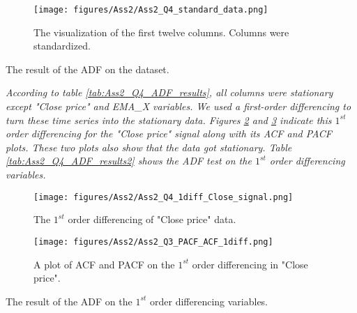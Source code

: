 \begin{figure}[H]
    \centering
    \begin{minipage}[b]{1\textwidth}
        \texttt{[image: figures/Ass2/Ass2\_Q4\_standard\_data.png]}
    \end{minipage}
    \caption{The visualization of the first twelve columns. Columns were standardized.}
    \label{fig:Ass2_Q4_standard_data}
\end{figure}


\begin{table}[H]
\centering
\caption{The result of the \gls{ADF} on the dataset.}
\label{tab:Ass2_Q4_ADF_results}

\end{table}

\textit{According to table \ref{tab:Ass2_Q4_ADF_results}, all columns were stationary except "Close price" and EMA\_X variables.  
We used a first-order differencing to turn these time series into the stationary data. Figures \ref{fig:Ass2_Q4_1diff_Close_signal} and \ref{fig:Ass2_Q4_PACF_ACF_1diff} indicate this $1^{st}$ order differencing for the "Close price" signal along with its \gls{ACF} and \gls{PACF} plots. These two plots also show that the data got stationary. Table \ref{tab:Ass2_Q4_ADF_results2} shows the ADF test on the $1^{st}$ order differencing variables.}

\begin{figure}[H]
    \centering
    \begin{minipage}[b]{1\textwidth}
        \texttt{[image: figures/Ass2/Ass2\_Q4\_1diff\_Close\_signal.png]}
    \end{minipage}
    \caption{The $1^{st}$ order differencing of "Close price" data.}
    \label{fig:Ass2_Q4_1diff_Close_signal}
\end{figure}

\begin{figure}[H]
    \centering
    \begin{minipage}[b]{1\textwidth}
        \texttt{[image: figures/Ass2/Ass2\_Q3\_PACF\_ACF\_1diff.png]}
    \end{minipage}
    \caption{A plot of \gls{ACF} and \gls{PACF} on the $1^{st}$ order differencing in "Close price".}
    \label{fig:Ass2_Q4_PACF_ACF_1diff}
\end{figure}

\begin{table}[H]
\centering
\caption{The result of the \gls{ADF} on the $1^{st}$ order differencing variables.}
\label{tab:Ass2_Q4_ADF_results2}

\end{table}



